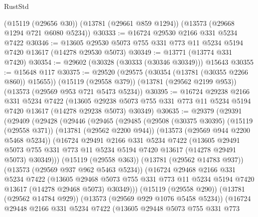 \begin{lexlean}{RustStd}
\begin{coremodule}
    (@15119 (@29656 @30))
    (@13781 (@29661 @859 @1294))
    (@13573 (@29668 @1294 @721 @6080 @5234))
@30333 := @16724 @29530 @2166 @331 @5234 @7422
@30346 := @13605 @29530 @5073 @755 @331 @773 @11 @5234 @5194 @7420 @13617 (@14278 @29530 @5073)
@30349 := @13771 (@13774 @331 @7420)
@30354 := @29602 (@30328 (@30333 (@30346 @30349))) @15643
@30355 := @15648 @117
@30375 := @29520
    (@29575 (@30354 (@13781 (@30355 @2266 @860)) @15655))
    (@15119 (@29558 @379))
    (@13781 (@29562 @2199 @953))
    (@13573 (@29569 @953 @721 @5473 @5234))
@30395 := @16724
    @29238
    @2166
    @331
    @5234
    @7422
    (@13605 @29238 @5073 @755 @331 @773 @11 @5234 @5194 @7420 @13617 (@14278 @29238 @5073) @30349)
@30635 := @29379
    (@29391
      (@29409
        (@29428
          (@29446
            (@29465
              (@29485
                (@29508
                  (@30375 @30395)
                  (@15119 (@29558 @371))
                  (@13781 (@29562 @2200 @944))
                  (@13573 (@29569 @944 @2200 @5468 @5234))
                  (@16724
                    @29491
                    @2166
                    @331
                    @5234
                    @7422
                    (@13605
                      @29491
                      @5073
                      @755
                      @331
                      @773
                      @11
                      @5234
                      @5194
                      @7420
                      @13617
                      (@14278 @29491 @5073)
                      @30349)))
                (@15119 (@29558 @363))
                (@13781 (@29562 @14783 @937))
                (@13573 (@29569 @937 @962 @5463 @5234))
                (@16724
                  @29468
                  @2166
                  @331
                  @5234
                  @7422
                  (@13605
                    @29468
                    @5073
                    @755
                    @331
                    @773
                    @11
                    @5234
                    @5194
                    @7420
                    @13617
                    (@14278 @29468 @5073)
                    @30349)))
              (@15119 (@29558 @290))
              (@13781 (@29562 @14784 @929))
              (@13573 (@29569 @929 @1076 @5458 @5234))
              (@16724
                @29448
                @2166
                @331
                @5234
                @7422
                (@13605
                  @29448
                  @5073
                  @755
                  @331
                  @773

\end{coremodule}
\end{lexlean}
